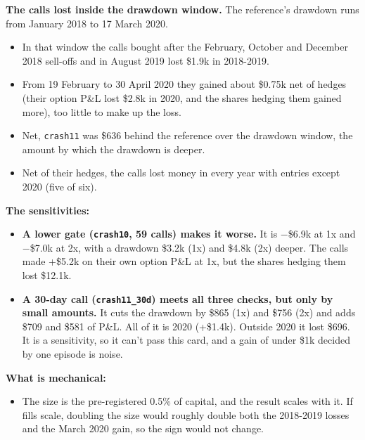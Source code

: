 \documentclass{article}
\begin{document}
\textbf{The calls lost inside the drawdown window.} The reference's drawdown runs from January 2018 to 17 March 2020.

\begin{itemize}

\item In that window the calls bought after the February, October and December 2018 sell-offs and in August 2019 lost \$1.9k in 2018-2019.

\item From 19 February to 30 April 2020 they gained about \$0.75k net of hedges (their option P\&L lost \$2.8k in 2020, and the shares hedging them gained more), too little to make up the loss.

\item Net, \texttt{crash11} was \$636 behind the reference over the drawdown window, the amount by which the drawdown is deeper.

\item Net of their hedges, the calls lost money in every year with entries except 2020 (five of six).

\end{itemize}

\textbf{The sensitivities:}

\begin{itemize}

\item \textbf{A lower gate (\texttt{crash10}, 59 calls) makes it worse.} It is \ensuremath{-}\$6.9k at 1x and \ensuremath{-}\$7.0k at 2x, with a drawdown \$3.2k (1x) and \$4.8k (2x) deeper. The calls made +\$5.2k on their own option P\&L at 1x, but the shares hedging them lost \$12.1k.

\item \textbf{A 30-day call (\texttt{crash11\_\allowbreak{}30d}) meets all three checks, but only by small amounts.} It cuts the drawdown by \$865 (1x) and \$756 (2x) and adds \$709 and \$581 of P\&L. All of it is 2020 (+\$1.4k). Outside 2020 it lost \$696. It is a sensitivity, so it can't pass this card, and a gain of under \$1k decided by one episode is noise.

\end{itemize}

\textbf{What is mechanical:}

\begin{itemize}

\item The size is the pre-registered 0.5\% of capital, and the result scales with it. If fills scale, doubling the size would roughly double both the 2018-2019 losses and the March 2020 gain, so the sign would not change.

\end{itemize}
\end{document}
